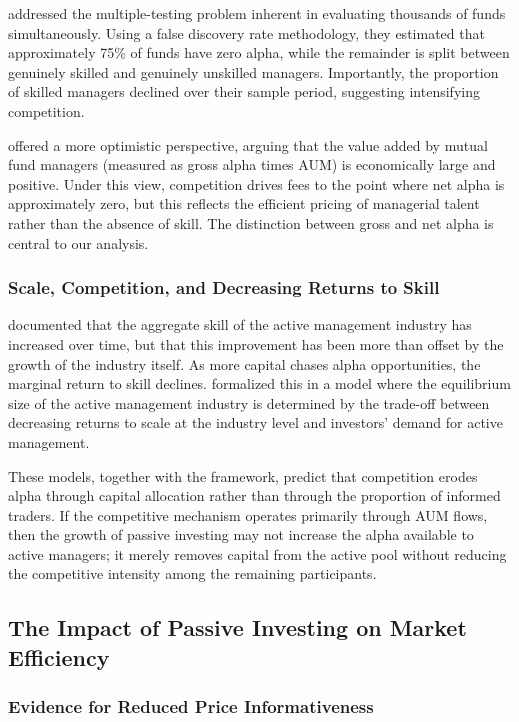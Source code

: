 \documentclass[11pt, a4paper]{article}
\begin{document}
\textcite{barras2010} addressed the multiple-testing problem inherent in evaluating thousands of funds simultaneously. Using a false discovery rate methodology, they estimated that approximately 75\% of funds have zero alpha, while the remainder is split between genuinely skilled and genuinely unskilled managers. Importantly, the proportion of skilled managers declined over their sample period, suggesting intensifying competition.

\textcite{berk2015} offered a more optimistic perspective, arguing that the value added by mutual fund managers (measured as gross alpha times AUM) is economically large and positive. Under this view, competition drives fees to the point where net alpha is approximately zero, but this reflects the efficient pricing of managerial talent rather than the absence of skill. The distinction between gross and net alpha is central to our analysis.

\subsubsection{Scale, Competition, and Decreasing Returns to Skill}

\textcite{pastor2015} documented that the aggregate skill of the active management industry has increased over time, but that this improvement has been more than offset by the growth of the industry itself. As more capital chases alpha opportunities, the marginal return to skill declines. \textcite{pastor2012} formalized this in a model where the equilibrium size of the active management industry is determined by the trade-off between decreasing returns to scale at the industry level and investors' demand for active management.

These models, together with the \textcite{berk2004} framework, predict that competition erodes alpha through capital allocation rather than through the proportion of informed traders. If the competitive mechanism operates primarily through AUM flows, then the growth of passive investing may not increase the alpha available to active managers; it merely removes capital from the active pool without reducing the competitive intensity among the remaining participants.

\subsection{The Impact of Passive Investing on Market Efficiency}

\subsubsection{Evidence for Reduced Price Informativeness}
\end{document}
